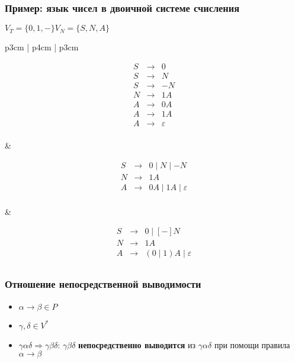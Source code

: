\documentclass{beamer}
\begin{document}
\begin{frame}[fragile]
  \transwipe[direction=90]
  \frametitle{Пример: язык чисел в двоичной системе счисления}

\begin{center}
  $V_T = \{ 0, 1, - \} V_N = \{ S, N, A \}$
\end{center}

\begin{tabular}{p{3cm} | p{4cm} | p{3cm}}

\[
\begin{array}{rcl}
S& \rightarrow & 0 \\
S& \rightarrow & N \\
S& \rightarrow & - N \\
N& \rightarrow & 1 A \\
A& \rightarrow & 0 A \\
A& \rightarrow & 1 A \\
A& \rightarrow & \varepsilon \\
\end{array}
\]

& \pause

\[
\begin{array}{rcl}
S& \rightarrow & 0 \mid N \mid - N  \\
N& \rightarrow & 1 A \\
A& \rightarrow & 0 A \mid 1 A  \mid \varepsilon\\
\end{array}
\]

& \pause

\[
\begin{array}{rcl}
S& \rightarrow & 0 \mid [-] N  \\
N& \rightarrow & 1 A \\
A& \rightarrow & (0 \mid 1) A  \mid \varepsilon\\
\end{array}
\]

\end{tabular}
\end{frame}

\begin{frame}[fragile]
  \transwipe[direction=90]
  \frametitle{Отношение непосредственной выводимости}
  \begin{itemize}
    \item $\alpha \rightarrow \beta \in P$
    \item $\gamma, \delta \in V^*$
    \item $\gamma \alpha \delta \Rightarrow \gamma \beta \delta$: $\gamma \beta \delta$ \textbf{непосредственно выводится} из $\gamma \alpha \delta$ при помощи правила $\alpha \rightarrow \beta$
  \end{itemize}
\end{frame}
\end{document}
